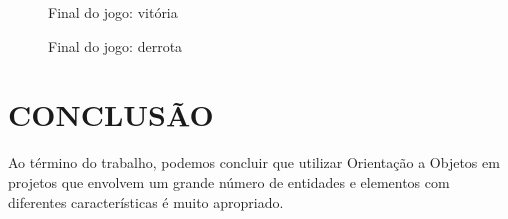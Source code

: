 \documentclass[rel_mlp]{iiufrgs}
\begin{document}
\begin{figure}[htb]
    \centering
    \caption{Final do jogo: vitória}
    \label{fig:figura1}
\end{figure}

\begin{figure}[htb]
    \centering
    \caption{Final do jogo: derrota}
    \label{fig:figura1}
\end{figure}

%
\chapter{CONCLUSÃO}

Ao término do trabalho, podemos concluir que utilizar Orientação a Objetos em projetos que envolvem um grande número de entidades e elementos com diferentes características é muito apropriado.
\end{document}
